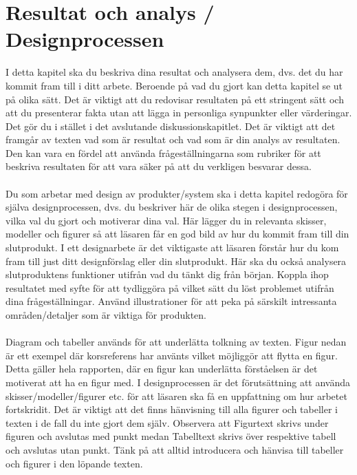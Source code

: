 \section{Resultat och analys / Designprocessen}
I detta kapitel ska du beskriva dina resultat och analysera dem, dvs. det du har kommit fram till i ditt arbete. Beroende på vad du gjort kan detta kapitel se ut på olika sätt. Det är viktigt att du redovisar resultaten på ett stringent sätt och att du presenterar fakta utan att lägga in personliga synpunkter eller värderingar. Det gör du i stället i det avslutande diskussionskapitlet. Det är viktigt att det framgår av texten vad som är resultat och vad som är din analys av resultaten. Den kan vara en fördel att använda frågeställningarna som rubriker för att beskriva resultaten för att vara säker på att du verkligen besvarar dessa.\\ \\
Du som arbetar med design av produkter/system ska i detta kapitel redogöra för själva designprocessen, dvs. du beskriver här de olika stegen i designprocessen, vilka val du gjort och motiverar dina val. Här lägger du in relevanta skisser, modeller och figurer  så att läsaren får en god bild av hur du kommit fram till din slutprodukt. I ett designarbete är det viktigaste att läsaren förstår hur du kom fram till just ditt designförslag eller din slutprodukt. Här ska du också analysera slutproduktens funktioner utifrån vad du tänkt dig från början. Koppla ihop resultatet med syfte för att tydliggöra på vilket sätt du löst problemet utifrån dina frågeställningar. Använd illustrationer för att peka på särskilt intressanta områden/detaljer som är viktiga för produkten.\\ \\
Diagram och tabeller används för att underlätta tolkning av texten. Figur nedan är ett exempel där korsreferens har använts vilket möjliggör att flytta en figur. Detta gäller hela rapporten, där en figur kan underlätta förståelsen är det motiverat att ha en figur med. I designprocessen  är det förutsättning att använda skisser/modeller/figurer etc. för att läsaren ska få en uppfattning om hur arbetet fortskridit. Det är viktigt att det finns hänvisning till alla figurer och tabeller i texten i de fall du inte gjort dem själv. Observera att Figurtext skrivs under figuren och avslutas med punkt medan Tabelltext skrivs över respektive tabell och avslutas utan punkt. Tänk på att alltid introducera och hänvisa till tabeller och figurer i den löpande texten.